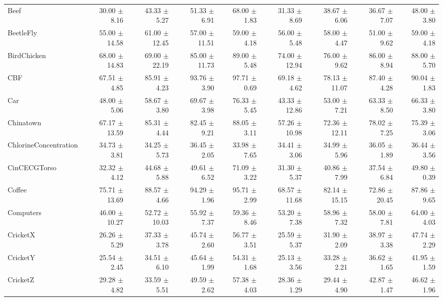 \begin{landscape}
\begin{longtable}{lrrrrrrrr}
Beef & 30.00 $\pm$ 8.16 & 43.33 $\pm$ 5.27 & 51.33 $\pm$ 6.91 & 68.00 $\pm$ 1.83 & 31.33 $\pm$ 8.69 & 38.67 $\pm$ 6.06 & 36.67 $\pm$ 7.07 & 48.00 $\pm$ 3.80 \\
BeetleFly & 55.00 $\pm$ 14.58 & 61.00 $\pm$ 12.45 & 57.00 $\pm$ 11.51 & 59.00 $\pm$ 4.18 & 56.00 $\pm$ 5.48 & 58.00 $\pm$ 4.47 & 51.00 $\pm$ 9.62 & 59.00 $\pm$ 4.18 \\
BirdChicken & 68.00 $\pm$ 14.83 & 69.00 $\pm$ 22.19 & 85.00 $\pm$ 11.73 & 89.00 $\pm$ 5.48 & 74.00 $\pm$ 12.94 & 76.00 $\pm$ 9.62 & 86.00 $\pm$ 8.94 & 88.00 $\pm$ 5.70 \\
CBF & 67.51 $\pm$ 4.85 & 85.91 $\pm$ 4.23 & 93.76 $\pm$ 3.90 & 97.71 $\pm$ 0.69 & 69.18 $\pm$ 4.62 & 78.13 $\pm$ 11.07 & 87.40 $\pm$ 4.28 & 90.04 $\pm$ 1.83 \\
Car & 48.00 $\pm$ 5.06 & 58.67 $\pm$ 3.80 & 69.67 $\pm$ 3.98 & 76.33 $\pm$ 5.45 & 43.33 $\pm$ 12.86 & 53.00 $\pm$ 7.21 & 63.33 $\pm$ 8.50 & 66.33 $\pm$ 3.80 \\
Chinatown & 67.17 $\pm$ 13.59 & 85.31 $\pm$ 4.44 & 82.45 $\pm$ 9.21 & 88.05 $\pm$ 3.11 & 57.26 $\pm$ 10.98 & 72.36 $\pm$ 12.11 & 78.02 $\pm$ 7.25 & 75.39 $\pm$ 3.06 \\
ChlorineConcentration & 34.73 $\pm$ 3.81 & 34.25 $\pm$ 5.73 & 36.45 $\pm$ 2.05 & 33.98 $\pm$ 7.65 & 34.41 $\pm$ 3.06 & 34.99 $\pm$ 5.96 & 36.05 $\pm$ 1.89 & 36.44 $\pm$ 3.56 \\
CinCECGTorso & 32.32 $\pm$ 4.12 & 44.68 $\pm$ 5.88 & 49.61 $\pm$ 6.52 & 71.09 $\pm$ 3.22 & 31.30 $\pm$ 5.37 & 40.86 $\pm$ 7.99 & 37.54 $\pm$ 6.84 & 49.80 $\pm$ 0.39 \\
Coffee & 75.71 $\pm$ 13.69 & 88.57 $\pm$ 4.66 & 94.29 $\pm$ 1.96 & 95.71 $\pm$ 2.99 & 68.57 $\pm$ 11.68 & 82.14 $\pm$ 15.15 & 72.86 $\pm$ 20.45 & 87.86 $\pm$ 9.65 \\
Computers & 46.00 $\pm$ 10.27 & 52.72 $\pm$ 10.03 & 55.92 $\pm$ 7.37 & 59.36 $\pm$ 8.46 & 53.20 $\pm$ 7.38 & 58.96 $\pm$ 7.32 & 58.00 $\pm$ 7.81 & 64.00 $\pm$ 4.03 \\
CricketX & 26.26 $\pm$ 5.29 & 37.33 $\pm$ 3.78 & 45.74 $\pm$ 2.60 & 56.77 $\pm$ 3.51 & 25.59 $\pm$ 5.37 & 31.90 $\pm$ 2.09 & 38.97 $\pm$ 3.38 & 47.74 $\pm$ 2.29 \\
CricketY & 25.54 $\pm$ 2.45 & 34.51 $\pm$ 6.10 & 45.64 $\pm$ 1.99 & 54.31 $\pm$ 1.68 & 25.13 $\pm$ 3.56 & 33.28 $\pm$ 2.21 & 36.62 $\pm$ 1.65 & 41.95 $\pm$ 1.59 \\
CricketZ & 29.28 $\pm$ 4.82 & 33.59 $\pm$ 5.51 & 49.59 $\pm$ 2.62 & 57.38 $\pm$ 4.03 & 28.36 $\pm$ 1.29 & 29.44 $\pm$ 4.90 & 42.87 $\pm$ 1.47 & 46.62 $\pm$ 1.96 \\

\end{longtable}
\end{landscape}
